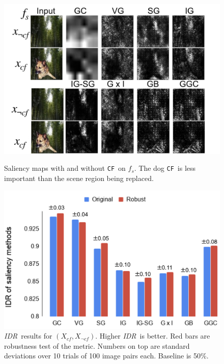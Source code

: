 \documentclass[twoside]{article}
\newcommand{\CF}{\texttt{CF}}
\newcommand{\IDR}{\textit{IDR}}
\begin{document}
\begin{figure}[ht]
\centering
\begin{minipage}{.48\textwidth}
  \centering
  \includegraphics[width=1.\linewidth]{figures/id_demo.jpg}
  \caption{Saliency maps with and without \CF~on $f_s$. The dog \CF~is less important than the scene region being replaced.}
  \label{fig:id_demo}
\end{minipage}
  \hfill
\begin{minipage}{.48\textwidth}
  \centering
  \includegraphics[width=1.\linewidth]{figures/id_bar.jpg}
  \caption{\IDR~results for $(X_{cf}, X_{\neg cf})$. Higher \IDR~is better. Red bars are robustness test of the metric. Numbers on top are standard deviations over 10 trials of 100 image pairs each. Baseline is 50\%.}
  \label{fig:id_bar}
\end{minipage}
\end{figure}
\end{document}
